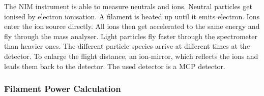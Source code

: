 	The NIM instrument is able to measure neutrals and ions. Neutral particles get ionised by electron ionisation. A filament is heated up until it emits electron. Ions enter the ion source directly.  %
	All ions then get accelerated to the same energy and fly through the mass analyser. Light particles fly faster through the spectrometer than heavier ones. The different particle species arrive at different times at the detector. To enlarge the flight distance, an ion-mirror, which reflects the ions and leads them back to the detector. The used detector is a MCP detector. %
	
		\subsubsection{Filament Power Calculation}
		
